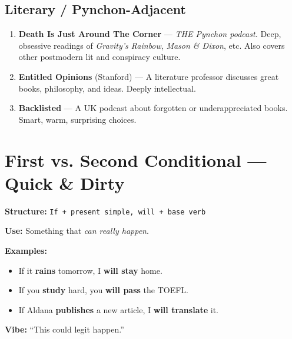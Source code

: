 \documentclass[11pt,a4paper]{article}
\begin{document}
\subsection{Literary / Pynchon-Adjacent}
\begin{enumerate}[label=\textbf{\arabic*.}]
    \item \textbf{Death Is Just Around The Corner} --- 
          \emph{THE Pynchon podcast.} Deep, obsessive readings of 
          \emph{Gravity's Rainbow}, \emph{Mason \& Dixon}, etc. 
          Also covers other postmodern lit and conspiracy culture.
    \item \textbf{Entitled Opinions} (Stanford) --- A literature professor 
          discusses great books, philosophy, and ideas. Deeply intellectual.
    \item \textbf{Backlisted} --- A UK podcast about forgotten or 
          underappreciated books. Smart, warm, surprising choices.
\end{enumerate}

\newpage
\section{First vs. Second Conditional --- Quick \& Dirty}

\begin{tcolorbox}[colback=red!5!white, colframe=red!60!black, 
    title=\textbf{FIRST CONDITIONAL --- Real / Possible Future}]
\textbf{Structure:} \texttt{If + present simple, will + base verb}

\textbf{Use:} Something that \emph{can really happen}.

\textbf{Examples:}
\begin{itemize}
    \item If it \textbf{rains} tomorrow, I \textbf{will stay} home.
    \item If you \textbf{study} hard, you \textbf{will pass} the TOEFL.
    \item If Aldana \textbf{publishes} a new article, I \textbf{will translate} it.
\end{itemize}

\textbf{Vibe:} ``This could legit happen.''
\end{tcolorbox}

\vspace{0.5cm}
\end{document}
